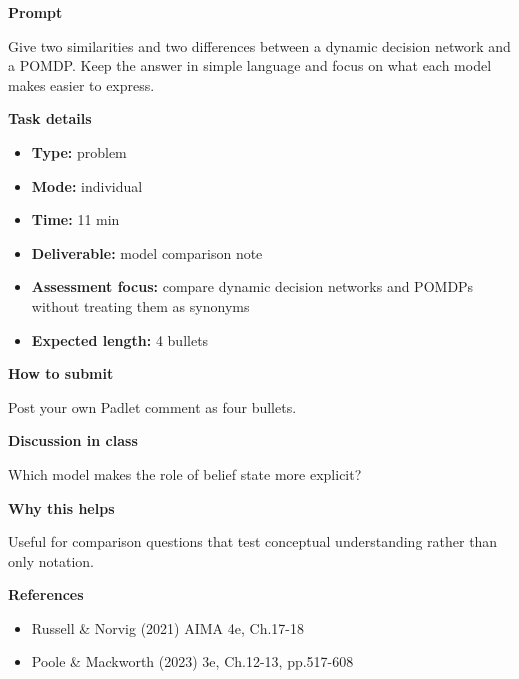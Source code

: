 \documentclass[11pt]{article}
\begin{document}
\begin{tcolorbox}[colback=white,colframe=MidnightBlue,title={Q3 Structured Problem},fonttitle=\bfseries,breakable]
\begin{center}
\end{center}

{\large\bfseries\color{MidnightBlue} Prompt}\par\medskip
Give two similarities and two differences between a dynamic decision network and a POMDP. Keep the answer in simple language and focus on what each model makes easier to express.

{\large\bfseries\color{MidnightBlue} Task details}\par\medskip
\begin{itemize}\item \textbf{Type:} problem
\item \textbf{Mode:} individual
\item \textbf{Time:} 11 min
\item \textbf{Deliverable:} model comparison note
\item \textbf{Assessment focus:} compare dynamic decision networks and POMDPs without treating them as synonyms
\item \textbf{Expected length:} 4 bullets\end{itemize}

{\large\bfseries\color{MidnightBlue} How to submit}\par\medskip
Post your own Padlet comment as four bullets.

{\large\bfseries\color{MidnightBlue} Discussion in class}\par\medskip
Which model makes the role of belief state more explicit?

{\large\bfseries\color{MidnightBlue} Why this helps}\par\medskip
Useful for comparison questions that test conceptual understanding rather than only notation.

{\large\bfseries\color{MidnightBlue} References}\par\medskip
\begin{itemize}\item Russell \& Norvig (2021) AIMA 4e, Ch.17-18
\item Poole \& Mackworth (2023) 3e, Ch.12-13, pp.517-608\end{itemize}
\end{tcolorbox}
\end{document}
